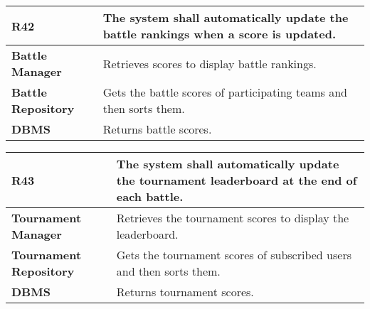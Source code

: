 \begin{table}[h!]
  \centering
  \begin{tabular}{lp{12cm}}
    \hline
\textbf{R42} & The system shall automatically update the battle rankings when a score is updated. \\
    \hline
    \hline
    \textbf{Battle Manager} &  Retrieves scores to display battle rankings.\\
    \textbf{Battle Repository} & Gets the battle scores of participating teams and then sorts them.\\
    \textbf{DBMS} & Returns battle scores. \\
    \hline
  \end{tabular}
\end{table}


\begin{table}[h!]
  \centering
  \begin{tabular}{lp{12cm}}
    \hline
    \textbf{R43} & The system shall automatically update the tournament leaderboard at the end of each battle. \\
    \hline
    \hline
    \textbf{Tournament Manager} & Retrieves the tournament scores to display the leaderboard. \\
    \textbf{Tournament Repository} &  Gets the tournament scores of subscribed users and then sorts them.\\
    \textbf{DBMS} & Returns tournament scores. \\
    \hline
  \end{tabular}
\end{table}